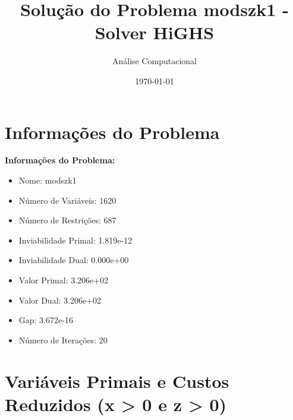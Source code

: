 \documentclass[12pt]{article}
\title{Solução do Problema modszk1 - Solver HiGHS}
\author{Análise Computacional}
\date{\today}
\begin{document}
\maketitle

\section{Informações do Problema}

\textbf{Informações do Problema:}
\begin{itemize}
\item Nome: modszk1
\item Número de Variáveis: 1620
\item Número de Restrições: 687
\item Inviabilidade Primal: 1.819e-12
\item Inviabilidade Dual: 0.000e+00
\item Valor Primal: 3.206e+02
\item Valor Dual: 3.206e+02
\item Gap: 3.672e-16
\item Número de Iterações: 20
\end{itemize}


\section{Variáveis Primais e Custos Reduzidos (x > 0 e z > 0)}
\end{document}

